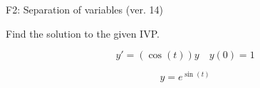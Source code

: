 \begin{exercise}
  \begin{exerciseTitle}F2: Separation of variables (ver. 14)\end{exerciseTitle}
  \begin{exerciseStatement}
    
Find the solution to the given IVP.

    
\[y'=( \cos\left(t\right) )y\hspace{1em} y(0)= 1\]

  \end{exerciseStatement}
  \begin{exerciseAnswer}
    
\[y= e^{\sin\left(t\right)}\]

  \end{exerciseAnswer}
\end{exercise}